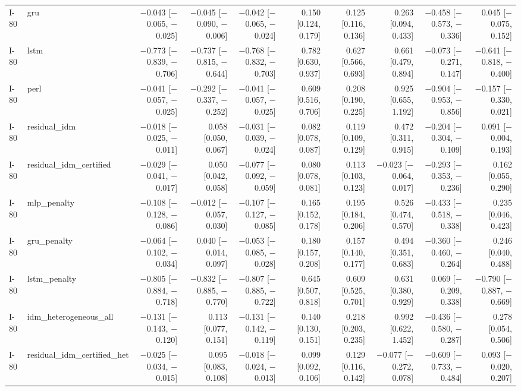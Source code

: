 \begin{table}[htbp]
{\begin{tabular}{llrrrrrrrr}
I-80 & gru & $-$0.043 [$-$0.065, $-$0.025] & $-$0.045 [$-$0.090, $-$0.006] & $-$0.042 [$-$0.065, $-$0.024] & 0.150 [0.124, 0.179] & 0.125 [0.116, 0.136] & 0.263 [0.094, 0.433] & $-$0.458 [$-$0.573, $-$0.336] & 0.045 [$-$0.075, 0.152] \\
I-80 & lstm & $-$0.773 [$-$0.839, $-$0.706] & $-$0.737 [$-$0.815, $-$0.644] & $-$0.768 [$-$0.832, $-$0.703] & 0.782 [0.630, 0.937] & 0.627 [0.566, 0.693] & 0.661 [0.479, 0.894] & $-$0.073 [$-$0.271, 0.147] & $-$0.641 [$-$0.818, $-$0.400] \\
I-80 & perl & $-$0.041 [$-$0.057, $-$0.025] & $-$0.292 [$-$0.337, $-$0.252] & $-$0.041 [$-$0.057, $-$0.025] & 0.609 [0.516, 0.706] & 0.208 [0.190, 0.225] & 0.925 [0.655, 1.192] & $-$0.904 [$-$0.953, $-$0.856] & $-$0.157 [$-$0.330, 0.021] \\
I-80 & residual\_idm & $-$0.018 [$-$0.025, $-$0.011] & 0.058 [0.050, 0.067] & $-$0.031 [$-$0.039, $-$0.024] & 0.082 [0.078, 0.087] & 0.119 [0.109, 0.129] & 0.472 [0.311, 0.915] & $-$0.204 [$-$0.304, $-$0.109] & 0.091 [$-$0.004, 0.193] \\
I-80 & residual\_idm\_certified & $-$0.029 [$-$0.041, $-$0.017] & 0.050 [0.042, 0.058] & $-$0.077 [$-$0.092, $-$0.059] & 0.080 [0.078, 0.081] & 0.113 [0.103, 0.123] & $-$0.023 [$-$0.064, 0.017] & $-$0.293 [$-$0.353, $-$0.236] & 0.162 [0.055, 0.290] \\
I-80 & mlp\_penalty & $-$0.108 [$-$0.128, $-$0.086] & $-$0.012 [$-$0.057, 0.030] & $-$0.107 [$-$0.127, $-$0.085] & 0.165 [0.152, 0.178] & 0.195 [0.184, 0.206] & 0.526 [0.474, 0.570] & $-$0.433 [$-$0.518, $-$0.338] & 0.235 [0.046, 0.423] \\
I-80 & gru\_penalty & $-$0.064 [$-$0.102, $-$0.034] & 0.040 [$-$0.014, 0.097] & $-$0.053 [$-$0.085, $-$0.028] & 0.180 [0.157, 0.208] & 0.157 [0.140, 0.177] & 0.494 [0.351, 0.683] & $-$0.360 [$-$0.460, $-$0.264] & 0.246 [0.040, 0.488] \\
I-80 & lstm\_penalty & $-$0.805 [$-$0.884, $-$0.718] & $-$0.832 [$-$0.885, $-$0.770] & $-$0.807 [$-$0.885, $-$0.722] & 0.645 [0.507, 0.818] & 0.609 [0.525, 0.701] & 0.631 [0.380, 0.929] & 0.069 [$-$0.209, 0.338] & $-$0.790 [$-$0.887, $-$0.669] \\
I-80 & idm\_heterogeneous\_all & $-$0.131 [$-$0.143, $-$0.120] & 0.113 [0.077, 0.151] & $-$0.131 [$-$0.142, $-$0.119] & 0.140 [0.130, 0.151] & 0.218 [0.203, 0.235] & 0.992 [0.622, 1.452] & $-$0.436 [$-$0.580, $-$0.287] & 0.278 [0.054, 0.506] \\
I-80 & residual\_idm\_certified\_het & $-$0.025 [$-$0.034, $-$0.015] & 0.095 [0.083, 0.108] & $-$0.018 [$-$0.024, $-$0.013] & 0.099 [0.092, 0.106] & 0.129 [0.116, 0.142] & $-$0.077 [$-$0.272, 0.078] & $-$0.609 [$-$0.733, $-$0.484] & 0.093 [$-$0.020, 0.207] \\

\end{tabular}}
\end{table}
